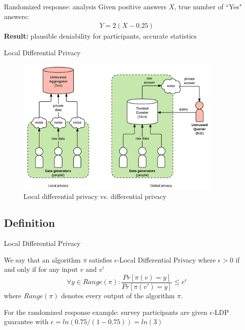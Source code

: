 \documentclass[aspectratio=43]{beamer}
\begin{document}

\begin{frame}{Randomized response: analysis}
    Given positive answers $X$, true number of ``Yes" answers:
    \begin{gather*}
        Y = 2(X-0.25)
    \end{gather*}
    \bigskip
    \textbf{Result:} plausible deniability for participants, accurate statistics
\end{frame}


\begin{frame}{Local Differential Privacy}
    \begin{figure}
        \centering
        \includegraphics[width=0.9\textwidth]{fig/ldp.png}
        \caption{Local differential privacy vs. differential privacy}
    \end{figure}
\end{frame}


\subsection{Definition}

\begin{frame}{Local Differential Privacy}
    \begin{definition}
        We say that an algorithm $\pi$ satisfies $\epsilon$-Local Differential Privacy where $\epsilon > 0$ if and only if for any input $v$ and $v'$
        $$
        \forall y \in Range(\pi): \frac{Pr[\pi(v) = y]}{Pr[\pi(v') = y]} \leq e^\epsilon
        $$
        where $Range(\pi)$ denotes every output of the algorithm $\pi$.
    \end{definition}
    \bigskip
    For the randomized response example: survey participants are given $\epsilon$-LDP guarantee with $\epsilon = ln(0.75/(1-0.75)) = ln(3)$
\end{frame}
\end{document}
